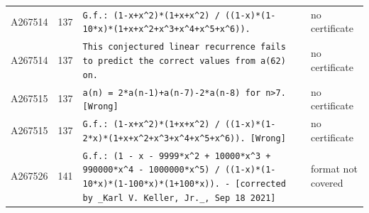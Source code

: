 \documentclass[11pt]{article}
\theoremstyle{definition}
\theoremstyle{remark}
\begin{document}
{\begin{longtable}{p{1.3cm}p{0.7cm}p{10cm}p{3cm}}
A267514 & 137 & \texttt{G.f.: \allowbreak{}(1-\allowbreak{}x+\allowbreak{}x\^{}2)\allowbreak{}*\allowbreak{}(1+\allowbreak{}x+\allowbreak{}x\^{}2)\allowbreak{} \allowbreak{}/\allowbreak{} \allowbreak{}((1-\allowbreak{}x)\allowbreak{}*\allowbreak{}(1-\allowbreak{}10*\allowbreak{}x)\allowbreak{}*\allowbreak{}(1+\allowbreak{}x+\allowbreak{}x\^{}2+\allowbreak{}x\^{}3+\allowbreak{}x\^{}4+\allowbreak{}x\^{}5+\allowbreak{}x\^{}6)\allowbreak{})\allowbreak{}.} & no certificate \\
A267514 & 137 & \texttt{This \allowbreak{}conjectured \allowbreak{}linear \allowbreak{}recurrence \allowbreak{}fails \allowbreak{}to \allowbreak{}predict \allowbreak{}the \allowbreak{}correct \allowbreak{}values \allowbreak{}from \allowbreak{}a(62)\allowbreak{} \allowbreak{}on.} & no certificate \\
A267515 & 137 & \texttt{a(n)\allowbreak{} \allowbreak{}=\allowbreak{} \allowbreak{}2*\allowbreak{}a(n-\allowbreak{}1)\allowbreak{}+\allowbreak{}a(n-\allowbreak{}7)\allowbreak{}-\allowbreak{}2*\allowbreak{}a(n-\allowbreak{}8)\allowbreak{} \allowbreak{}for \allowbreak{}n>7. \allowbreak{}[Wrong]} & no certificate \\
A267515 & 137 & \texttt{G.f.: \allowbreak{}(1-\allowbreak{}x+\allowbreak{}x\^{}2)\allowbreak{}*\allowbreak{}(1+\allowbreak{}x+\allowbreak{}x\^{}2)\allowbreak{} \allowbreak{}/\allowbreak{} \allowbreak{}((1-\allowbreak{}x)\allowbreak{}*\allowbreak{}(1-\allowbreak{}2*\allowbreak{}x)\allowbreak{}*\allowbreak{}(1+\allowbreak{}x+\allowbreak{}x\^{}2+\allowbreak{}x\^{}3+\allowbreak{}x\^{}4+\allowbreak{}x\^{}5+\allowbreak{}x\^{}6)\allowbreak{})\allowbreak{}. \allowbreak{}[Wrong]} & no certificate \\
A267526 & 141 & \texttt{G.f.: \allowbreak{}(1 \allowbreak{}-\allowbreak{} \allowbreak{}x \allowbreak{}-\allowbreak{} \allowbreak{}9999*\allowbreak{}x\^{}2 \allowbreak{}+\allowbreak{} \allowbreak{}10000*\allowbreak{}x\^{}3 \allowbreak{}+\allowbreak{} \allowbreak{}990000*\allowbreak{}x\^{}4 \allowbreak{}-\allowbreak{} \allowbreak{}1000000*\allowbreak{}x\^{}5)\allowbreak{} \allowbreak{}/\allowbreak{} \allowbreak{}((1-\allowbreak{}x)\allowbreak{}*\allowbreak{}(1-\allowbreak{}10*\allowbreak{}x)\allowbreak{}*\allowbreak{}(1-\allowbreak{}100*\allowbreak{}x)\allowbreak{}*\allowbreak{}(1+\allowbreak{}100*\allowbreak{}x)\allowbreak{})\allowbreak{}. \allowbreak{}-\allowbreak{} \allowbreak{}[corrected \allowbreak{}by \allowbreak{}\_Karl \allowbreak{}V. \allowbreak{}Keller,\allowbreak{} \allowbreak{}Jr.\_,\allowbreak{} \allowbreak{}Sep \allowbreak{}18 \allowbreak{}2021]} & format not covered \\

\end{longtable}}
\end{document}
